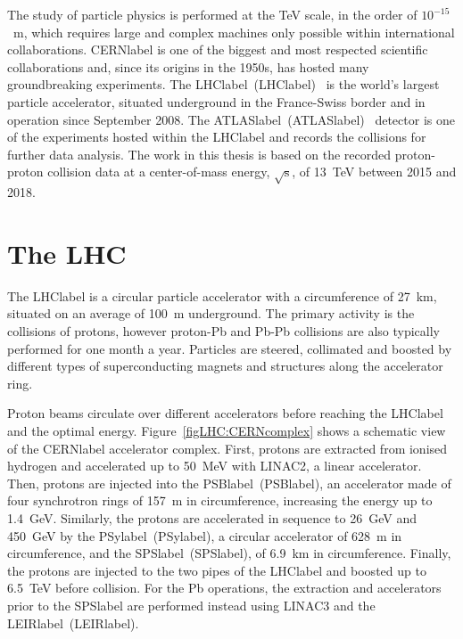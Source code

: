 The study of particle physics is performed at the TeV scale, in the order of $10^{-15}$~m, which requires large and complex machines only possible within international collaborations. \acrshort{CERNlabel} is one of the biggest and most respected scientific collaborations and, since its origins in the 1950s, has hosted many groundbreaking experiments. The \acrlong{LHClabel}~(\acrshort{LHClabel})~\cite{LHCmachine} is the world's largest particle accelerator, situated underground in the France-Swiss border and in operation since September 2008. The \acrlong{ATLASlabel}~(\acrshort{ATLASlabel})~\cite{ATLASmachine} detector is one of the experiments hosted within the \acrshort{LHClabel} and records the collisions for further data analysis. The work in this thesis is based on the recorded proton-proton collision data at a center-of-mass energy, $\sqrt{\text{s}}$, of 13~TeV between 2015 and 2018.

\section{The LHC}

The \acrshort{LHClabel} is a circular particle accelerator with a circumference of 27~km, situated on an average of 100~m underground. The primary activity is the collisions of protons, however proton-Pb and Pb-Pb collisions are also typically performed for one month a year. Particles are steered, collimated and boosted by different types of superconducting magnets and structures along the accelerator ring.

Proton beams circulate over different accelerators before reaching the \acrshort{LHClabel} and the optimal energy. Figure~\ref{figLHC:CERNcomplex} shows a schematic view of the \acrshort{CERNlabel} accelerator complex. First, protons are extracted from ionised hydrogen and accelerated up to 50~MeV with LINAC2, a linear accelerator. Then, protons are injected into the \acrlong{PSBlabel}~(\acrshort{PSBlabel}), an accelerator made of four synchrotron rings of 157~m in circumference, increasing the energy up to 1.4~GeV. Similarly, the protons are accelerated in sequence to 26~GeV and 450~GeV by the \acrlong{PSylabel}~(\acrshort{PSylabel}), a circular accelerator of 628~m in circumference, and the \acrlong{SPSlabel}~(\acrshort{SPSlabel}), of 6.9~km in circumference. Finally, the protons are injected to the two pipes of the \acrshort{LHClabel} and boosted up to 6.5~TeV before collision. For the Pb operations, the extraction and accelerators prior to the \acrshort{SPSlabel} are performed instead using LINAC3 and the \acrlong{LEIRlabel}~(\acrshort{LEIRlabel}).

